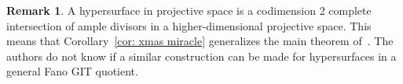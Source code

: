\documentclass[reqno, 12pt]{amsart}
\theoremstyle{definition}
\newtheorem{remark}[theorem]{Remark}
\numberwithin{equation}{section}
\begin{document}
\begin{remark}
A hypersurface in projective space is a codimension 2 complete intersection of ample divisors in a higher-dimensional projective space. This means that Corollary~\ref{cor: xmas miracle} generalizes the main theorem of~\cite{KKLL}. The authors do not know if a similar construction can be made for hypersurfaces in a general Fano GIT quotient. 
\end{remark}






\end{document}
